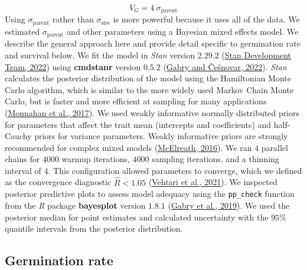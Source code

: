 \documentclass[
  12pt,
]{article}
\begin{document}
\[V_G = 4~\sigma_{\mathrm{parent}}\]
Using \(\sigma_{\mathrm{parent}}\) rather than \(\sigma_{\mathrm{sire}}\) is more powerful because it uses all of the data. We estimated \(\sigma_{\mathrm{parent}}\) and other parameters using a Bayesian mixed effects model. We describe the general approach here and provide detail specific to germination rate and survival below. We fit the model in \emph{Stan} version \(2.29.2\) (\protect\hyperlink{ref-stan_development_team_stan_2022}{Stan Development Team, 2022}) using \textbf{cmdstanr} version \(0.5.2\) (\protect\hyperlink{ref-gabry_cmdstanr_2022}{Gabry and Češnovar, 2022}). \emph{Stan} calculates the posterior distribution of the model using the Hamiltonian Monte Carlo algorithm, which is similar to the more widely used Markov Chain Monte Carlo, but is faster and more efficient at sampling for many applications (\protect\hyperlink{ref-monnahan_faster_2017}{Monnahan et al., 2017}). We used weakly informative normally distributed priors for parameters that affect the trait mean (intercepts and coefficients) and half-Cauchy priors for variance parameters. Weakly informative priors are strongly recommended for complex mixed models (\protect\hyperlink{ref-mcelreath_statistical_2016}{McElreath, 2016}). We ran \(4\) parallel chains for \(4000\) warmup iterations, \(4000\) sampling iterations, and a thinning interval of \(4\). This configuration allowed parameters to converge, which we defined as the convergence diagnostic \(\hat{R} < 1.05\) (\protect\hyperlink{ref-vehtari_rank-normalization_2021}{Vehtari et al., 2021}). We inspected posterior predictive plots to assess model adequacy using the \texttt{pp\_check} function from the \emph{R} package \textbf{bayesplot} version \(1.8.1\) (\protect\hyperlink{ref-gabry_visualization_2019}{Gabry et al., 2019}). We used the posterior median for point estimates and calculated uncertainty with the \(95\)\% quantile intervals from the posterior distribution.

\hypertarget{germination-rate}{%
\subsection{Germination rate}\label{germination-rate}}
\end{document}
